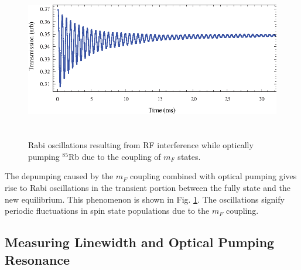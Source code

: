 \begin{figure}[htbp]
\begin{center}
\includegraphics[height=70mm]{./figures/rabi.eps}
\caption{\small{Rabi oscillations resulting from RF interference while optically pumping $^{85}$Rb due to the coupling of $m_F$ states.}}
\label{fig:rabi}
\end{center}
\end{figure}
The depumping caused by the $m_F$ coupling combined with optical pumping gives rise to Rabi oscillations in the transient portion between the fully state and the new equilibrium.  This phenomenon is shown in Fig. \ref{fig:rabi}.  The oscillations signify periodic fluctuations in spin state populations due to the $m_F$ coupling.    

\subsection{Measuring Linewidth and Optical Pumping Resonance}\label{MeasuringLinewidthandOpticalPumpingResonance}


